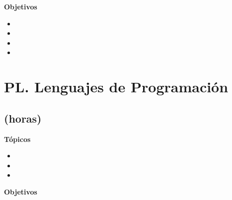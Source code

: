 \textbf{Objetivos}
\begin{itemize}
	\item \NCNUEVEObjUNO
	\item \NCNUEVEObjDOS
	\item \NCNUEVEObjTRES
	\item \NCNUEVEObjCUATRO
\end{itemize}

\section{PL. Lenguajes de Programación}\label{sec:BOK-PL}

\subsection{\PLUNODef  (\PLUNOHours horas)}\label{sec:BOK-PL1}

\textbf{Tópicos}
\begin{itemize}
	\item \PLUNOTopicHistoria
	\item \PLUNOTopicBreve
	\item \PLUNOTopicLos
\end{itemize}

\textbf{Objetivos}
